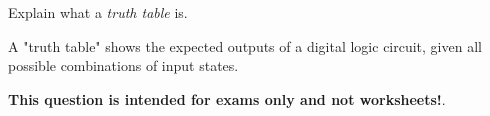 

Explain what a {\it truth table} is.







A "truth table" shows the expected outputs of a digital logic circuit, given all possible combinations of input states.







{\bf This question is intended for exams only and not worksheets!}.



